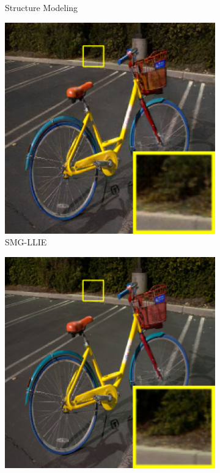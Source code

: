 \documentclass[a4paper]{ctexart}
\begin{document}
\begin{figure}[htb]
\begin{subfigure}{0.25\columnwidth}
			\captionsetup{font=scriptsize}
			\caption{Structure Modeling}
			\label{fig: Structure Modeling}
		\end{subfigure}
		\begin{subfigure}{0.25\columnwidth}
			\includegraphics[width=\linewidth]{picture/LLIE/Structure Modeling and Guidance/Ours}
			\captionsetup{font=scriptsize}
			\caption{SMG-LLIE}
			\label{fig: SMG-LLIE}
		\end{subfigure}
		\begin{subfigure}{0.25\columnwidth}
			\includegraphics[width=\linewidth]{picture/LLIE/Structure Modeling and Guidance/Ground Truth}

\end{subfigure}
\end{figure}
\end{document}
